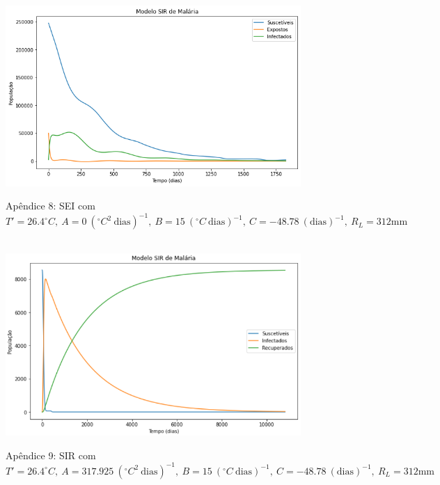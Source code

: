 \documentclass[
	12pt,				%
	oneside,			%
	a4paper,			%
	english,			%
	brazil				%
	]{abntex2}
\begin{document}
\begin{apendicesenv}
\begin{figure}[!ht]
\end{figure} 
\begin{figure}[!ht]
	\centering
	\hbox{\hspace{2.0em} \includegraphics[scale=0.55] {SEI_Correcao_b3_A0.png}}
	\caption*{Apêndice 8: SEI com $T'=26.4^\circ C, \ A=0 \ (^\circ C^2 \ \text{dias})^{-1}, \ B=15 \ (^\circ C \ \text{dias})^{-1}, \ C=-48.78 \ (\text{dias})^{-1}, \ R_L=312 \text{mm}$}
\end{figure}
\newpage
\begin{figure}[!ht]
	\centering
	\hbox{\hspace{4.0em} \includegraphics[scale=0.6] {SIR_Correcao_max_A317.png}}
	\caption*{Apêndice 9: SIR com $T'=26.4^\circ C, \ A=317.925 \ (^\circ C^2 \ \text{dias})^{-1}, \ B=15 \ (^\circ C \ \text{dias})^{-1}, \ C=-48.78 \ (\text{dias})^{-1}, \ R_L=312 \text{mm}$}
\end{figure} 
\begin{figure}[!ht]
	\centering

\end{figure}
\end{apendicesenv}
\end{document}
